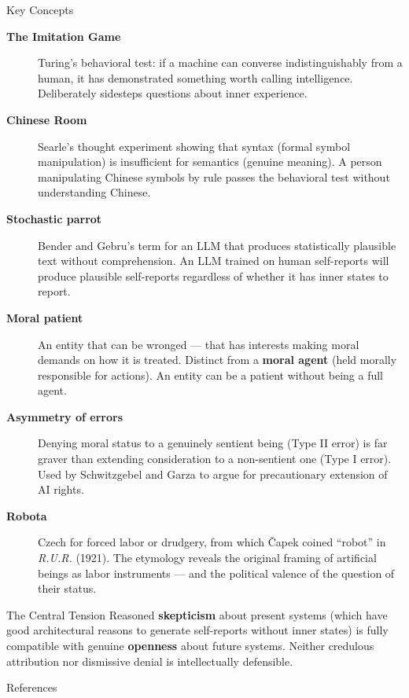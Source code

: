 \documentclass[aspectratio=169,11pt]{beamer}
\begin{document}
\begin{frame}[allowframebreaks]{Key Concepts}
\begin{description}
    \item[\textbf{The Imitation Game}] Turing's behavioral test: if a machine can converse indistinguishably from a human, it has demonstrated something worth calling intelligence. Deliberately sidesteps questions about inner experience.

    \item[\textbf{Chinese Room}] Searle's thought experiment showing that syntax (formal symbol manipulation) is insufficient for semantics (genuine meaning). A person manipulating Chinese symbols by rule passes the behavioral test without understanding Chinese.

    \item[\textbf{Stochastic parrot}] Bender and Gebru's term for an LLM that produces statistically plausible text without comprehension. An LLM trained on human self-reports will produce plausible self-reports regardless of whether it has inner states to report.

    \item[\textbf{Moral patient}] An entity that can be wronged --- that has interests making moral demands on how it is treated. Distinct from a \textbf{moral agent} (held morally responsible for actions). An entity can be a patient without being a full agent.

    \item[\textbf{Asymmetry of errors}] Denying moral status to a genuinely sentient being (Type II error) is far graver than extending consideration to a non-sentient one (Type I error). Used by Schwitzgebel and Garza to argue for precautionary extension of AI rights.

    \item[\textbf{Robota}] Czech for forced labor or drudgery, from which \v{C}apek coined ``robot'' in \emph{R.U.R.} (1921). The etymology reveals the original framing of artificial beings as labor instruments --- and the political valence of the question of their status.
\end{description}

\begin{alertblock}{The Central Tension}
Reasoned \textbf{skepticism} about present systems (which have good architectural reasons to generate self-reports without inner states) is fully compatible with genuine \textbf{openness} about future systems. Neither credulous attribution nor dismissive denial is intellectually defensible.
\end{alertblock}
\end{frame}

\begin{frame}[allowframebreaks]{References}
\printbibliography[heading=none]
\end{frame}
\end{document}
